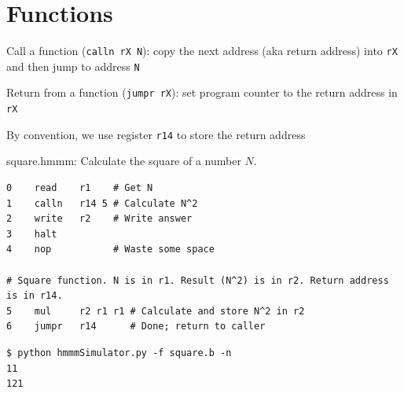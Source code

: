 \documentclass[8pt,a4paper,compress]{beamer}
\begin{document}
\section{Functions}

\begin{frame}[fragile]
\pause

Call a function (\lstinline{calln rX N}): copy the next address (aka return address) into \lstinline$rX$ and then jump to address \lstinline{N}

\pause
\bigskip

Return from a function (\lstinline{jumpr rX}): set program counter to the return address in \lstinline{rX}

\pause
\bigskip

By convention, we use register \lstinline{r14} to store the return address

\pause

\begin{framed}
\tiny square.hmmm: Calculate the square of a number $N$.
\end{framed}

\begin{lstlisting}[language={}]
0    read    r1    # Get N
1    calln   r14 5 # Calculate N^2 
2    write   r2    # Write answer
3    halt
4    nop           # Waste some space

# Square function. N is in r1. Result (N^2) is in r2. Return address is in r14.
5    mul     r2 r1 r1 # Calculate and store N^2 in r2
6    jumpr   r14      # Done; return to caller
\end{lstlisting}

\pause

\begin{lstlisting}[language={}]
$ python hmmmSimulator.py -f square.b -n
11
121
\end{lstlisting}
\end{frame}
\end{document}
